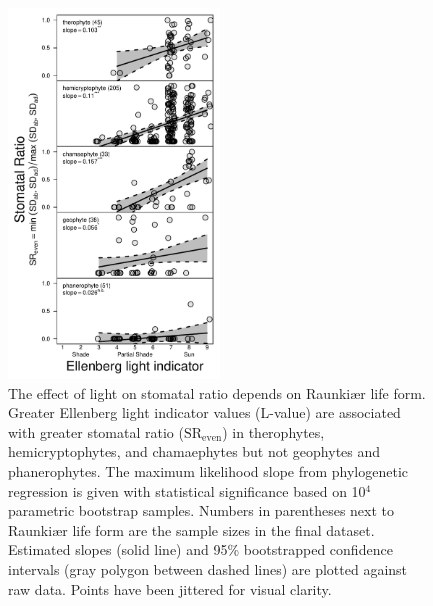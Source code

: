 \documentclass[12pt, oneside]{article}
\newcommand{\el}{L-value}
\begin{document}
\begin{figure}[ht]
\centerline{\includegraphics[width=0.5\textwidth]{figures/figure_SRmultReg.pdf}}
\caption{The effect of light on stomatal ratio depends on Raunki\ae r life form. Greater Ellenberg light indicator values (\el) are associated with greater stomatal ratio ($\mathrm{SR_{even}}$) in therophytes, hemicryptophytes, and chamaephytes but not geophytes and phanerophytes. The maximum likelihood slope from phylogenetic regression is given with statistical significance based on 10$^4$ parametric bootstrap samples. Numbers in parentheses next to Raunki\ae r life form are the sample sizes in the final dataset. Estimated slopes (solid line) and 95\% bootstrapped confidence intervals (gray polygon between dashed lines) are plotted against raw data. Points have been jittered for visual clarity.} 
\label{fig:SRmultReg}
\end{figure}
\end{document}
